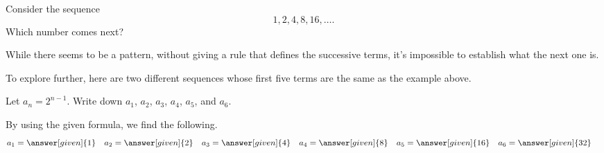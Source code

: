 \documentclass{ximera}
\begin{document}
\begin{question}
  Consider the sequence
  \[
  1, 2, 4, 8, 16, \dots.
  \]
  Which number comes next?
  \begin{multipleChoice}
  \end{multipleChoice}

While there seems to be a pattern, without giving a rule that defines the successive terms, it's impossible to establish what the next one is. 

\end{question}

To explore further, here are two different sequences whose first five terms are the same as the example above.

\begin{example}
  Let $a_n = 2^{n-1}$.  Write down $a_1$, $a_2$, $a_3$, $a_4$, $a_5$, and
  $a_6$.
  \begin{explanation}
    By using the given formula, we find the following.
    \begin{align*}
      a_1 &= \answer[given]{1} & a_2 &= \answer[given]{2} & 
      a_3 &= \answer[given]{4} & 
      a_4 &= \answer[given]{8} & 
      a_5 &= \answer[given]{16} & 
      a_6 &= \answer[given]{32}
    \end{align*}
  \end{explanation}
\end{example}
\end{document}
